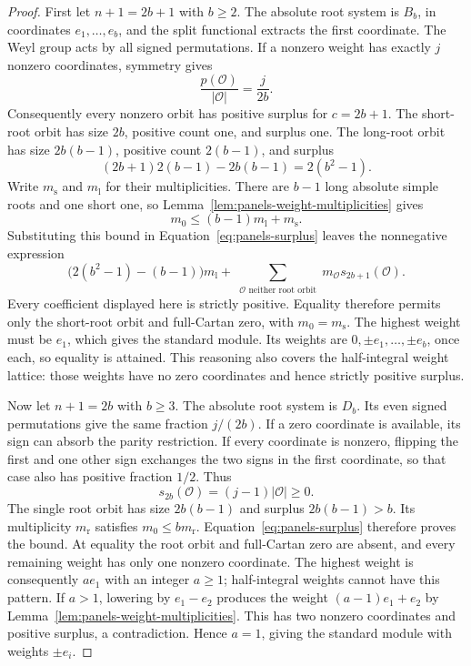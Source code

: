 \begin{proof}
First let $n+1=2b+1$ with $b\geq2$. The absolute root system is
$B_b$, in coordinates $e_1,\ldots,e_b$, and the split functional
extracts the first coordinate. The Weyl group acts by all signed
permutations. If a nonzero weight has exactly $j$ nonzero
coordinates, symmetry gives
\[
 \frac{p(\mathcal O)}{|\mathcal O|}=\frac{j}{2b}.
\]
Consequently every nonzero orbit has positive surplus for
$c=2b+1$. The short-root orbit has size $2b$, positive count one,
and surplus one. The long-root orbit has size $2b(b-1)$,
positive count $2(b-1)$, and surplus
\[
 (2b+1)2(b-1)-2b(b-1)=2(b^2-1).
\]
Write $m_{\mathrm s}$ and $m_{\mathrm l}$ for their
multiplicities. There are $b-1$ long absolute simple roots and one
short one, so Lemma~\ref{lem:panels-weight-multiplicities} gives
\[
 m_0\leq(b-1)m_{\mathrm l}+m_{\mathrm s}.
\]
Substituting this bound in Equation~\eqref{eq:panels-surplus}
leaves the nonnegative expression
\[
 \bigl(2(b^2-1)-(b-1)\bigr)m_{\mathrm l}
 +\sum_{\substack{\mathcal O\text{ neither root orbit}}}
       m_{\mathcal O}s_{2b+1}(\mathcal O).
\]
Every coefficient displayed here is strictly positive. Equality
therefore permits only the short-root orbit and full-Cartan zero,
with $m_0=m_{\mathrm s}$. The highest weight must be $e_1$,
which gives the standard module. Its weights are
$0,\pm e_1,\ldots,\pm e_b$, once each, so equality is attained.
This reasoning also covers the half-integral weight lattice: those
weights have no zero coordinates and hence strictly positive surplus.

Now let $n+1=2b$ with $b\geq3$. The absolute root system is
$D_b$. Its even signed permutations give the same fraction
$j/(2b)$. If a zero coordinate is available, its sign can absorb the
parity restriction. If every coordinate is nonzero, flipping the
first and one other sign exchanges the two signs in the first
coordinate, so that case also has positive fraction $1/2$.
Thus
\[
 s_{2b}(\mathcal O)=(j-1)|\mathcal O|\geq0.
\]
The single root orbit has size $2b(b-1)$ and surplus
$2b(b-1)>b$. Its multiplicity $m_{\mathrm r}$ satisfies
$m_0\leq b m_{\mathrm r}$. Equation~\eqref{eq:panels-surplus}
therefore proves the bound. At equality the root orbit and
full-Cartan zero are absent, and every remaining weight has only
one nonzero coordinate. The highest weight is consequently
$a e_1$ with an integer $a\geq1$; half-integral weights cannot
have this pattern. If $a>1$, lowering by $e_1-e_2$ produces the
weight $(a-1)e_1+e_2$ by
Lemma~\ref{lem:panels-weight-multiplicities}. This has two
nonzero coordinates and positive surplus, a contradiction.
Hence $a=1$, giving the standard module with weights $\pm e_i$.


\end{proof}
